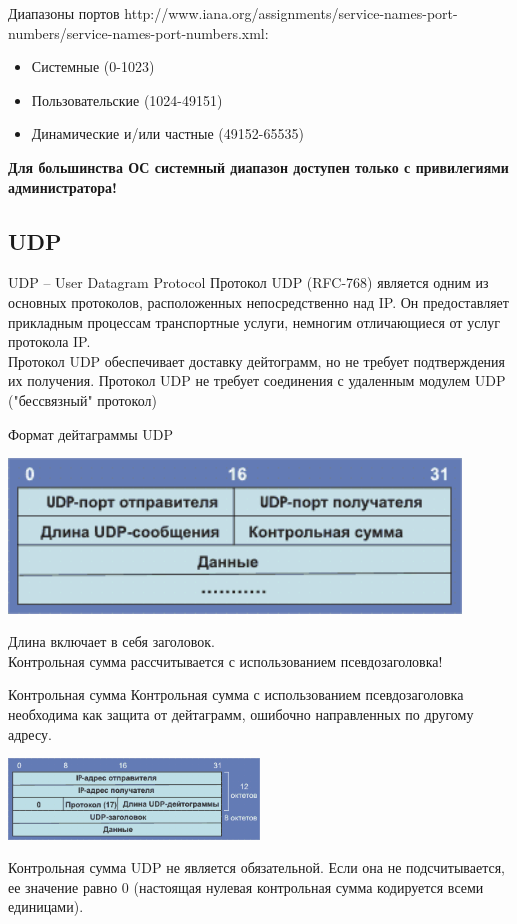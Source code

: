 \begin{frame}{Диапазоны портов}
	http://www.iana.org/assignments/service-names-port-numbers/service-names-port-numbers.xml:\\
	\begin{itemize}
		\item Системные (0-1023)
		\item Пользовательские (1024-49151)
		\item Динамические и/или частные (49152-65535)
	\end{itemize}
	\bigskip
	{\bfseries Для большинства ОС системный диапазон доступен только с привилегиями администратора!}
\end{frame}

\subsection{UDP}
\begin{frame}{UDP -- User Datagram Protocol}
Протокол UDP (RFC-768) является одним из основных протоколов,  расположенных непосредственно над IP. Он предоставляет прикладным процессам транспортные услуги,  немногим отличающиеся от услуг протокола IP.\\
\bigskip
Протокол UDP обеспечивает доставку дейтограмм,  но не требует подтверждения их получения. Протокол UDP не требует соединения с удаленным модулем UDP ("бессвязный" протокол)
\end{frame}

\begin{frame}{Формат дейтаграммы UDP}
	\begin{center}
		\includegraphics[width=0.9\textwidth]{04-udp_header.png}
	\end{center}
	Длина включает в себя заголовок.\\
	Контрольная сумма рассчитывается с использованием псевдозаголовка!
\end{frame}

\begin{frame}{Контрольная сумма}
Контрольная сумма с использованием псевдозаголовка необходима как защита от дейтаграмм, ошибочно направленных по другому адресу.
	\begin{center}
		\includegraphics[width=0.5\textwidth]{04-udp_pseudoheader.png}
	\end{center}
Контрольная сумма UDP не является обязательной. Если она не подсчитывается,  ее значение равно 0 (настоящая нулевая контрольная сумма кодируется всеми единицами).
\end{frame}

